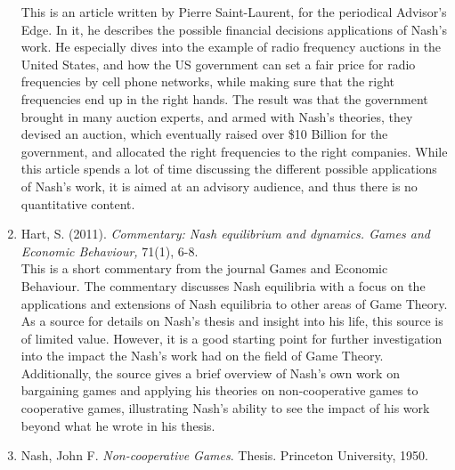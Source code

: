 \documentclass[11pt]{article}
\begin{document}
\begin{enumerate}
This is an article written by Pierre Saint-Laurent, for the periodical Advisor’s Edge. In it, he describes the possible financial decisions applications of Nash’s work. He especially dives into the example of radio frequency auctions in the United States, and how the US government can set a fair price for radio frequencies by cell phone networks, while making sure that the right frequencies end up in the right hands. The result was that the government brought in many auction experts, and armed with Nash’s theories, they devised an auction, which eventually raised over \$10 Billion for the government, and allocated the right frequencies to the right companies. While this article spends a lot of time discussing the different possible applications of Nash’s work, it is aimed at an advisory audience, and thus there is no quantitative content.\\ 

\item Hart, S. (2011). \textit{Commentary: Nash equilibrium and dynamics. Games and Economic Behaviour,} 71(1), 6-8.\\

This is a short commentary from the journal Games and Economic Behaviour. The commentary discusses Nash equilibria with a focus on the applications and extensions of Nash equilibria to other areas of Game Theory. As a source for details on Nash’s thesis and insight into his life, this source is of limited value. However, it is a good starting point for further investigation into the impact the Nash’s work had on the field of Game Theory. Additionally, the source gives a brief overview of Nash’s own work on bargaining games and applying his theories on non-cooperative games to cooperative games, illustrating Nash’s ability to see the impact of his work beyond what he wrote in his thesis.\\

\item Nash, John F. \textit{Non-cooperative Games}. Thesis. Princeton University, 1950.\\


\end{enumerate}
\end{document}

